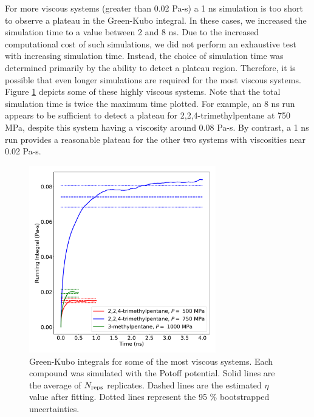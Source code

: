 \documentclass[preprint,review,12pt]{elsarticle}
\begin{document}
    For more viscous systems (greater than 0.02 Pa-s) a 1 ns simulation is too short to observe a plateau in the Green-Kubo integral. In these cases, we increased the simulation time to a value between 2 and 8 ns. Due to the increased computational cost of such simulations, we did not perform an exhaustive test with increasing simulation time. Instead, the choice of simulation time was determined primarily by the ability to detect a plateau region. Therefore, it is possible that even longer simulations are required for the most viscous systems. Figure \ref{fig:most_viscous} depicts some of these highly viscous systems. Note that the total simulation time is twice the maximum time plotted. For example, an 8 ns run appears to be sufficient to detect a plateau for 2,2,4-trimethylpentane at 750 MPa, despite this system having a viscosity around 0.08 Pa-s. By contrast, a 1 ns run provides a reasonable plateau for the other two systems with viscosities near 0.02 Pa-s.
    
    \begin{figure}[htb!]
    	\centering
    	\includegraphics[width=3.2in]{most_viscous_systems.pdf}
    	\caption{Green-Kubo integrals for some of the most viscous systems. Each compound was simulated with the Potoff potential. Solid lines are the average of $N_{\rm reps}$ replicates. Dashed lines are the estimated $\eta$ value after fitting. Dotted lines represent the 95 \% bootstrapped uncertainties.}
    	\label{fig:most_viscous}
    \end{figure} 
    
    
%    
%    
	
\end{document}
